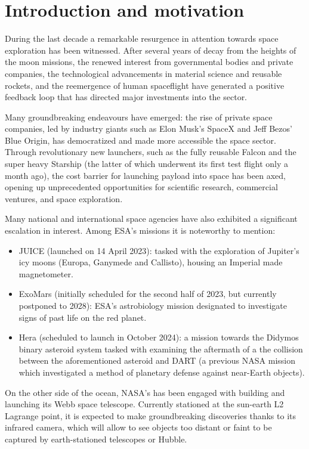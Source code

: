 \section{Introduction and motivation}
During the last decade a remarkable resurgence in attention towards space exploration has been witnessed. After several years of decay from the heights of the moon missions, the renewed interest from governmental bodies and private companies, the technological advancements in material science and reusable rockets, and the reemergence of human spaceflight have generated a positive feedback loop that has directed major investments into the sector.

Many groundbreaking endeavours have emerged: the rise of private space companies, led by industry giants such as Elon Musk's SpaceX and Jeff Bezos' Blue Origin, has democratized and made more accessible the space sector. Through revolutionary new launchers, such as the fully reusable Falcon and the super heavy Starship (the latter of which underwent its first test flight only a month ago), the cost barrier for launching payload into space has been axed, opening up unprecedented opportunities for scientific research, commercial ventures, and space exploration.

Many national and international space agencies have also exhibited a significant escalation in interest. Among ESA's missions it is noteworthy to mention:

\begin{itemize}
    \item JUICE (launched on 14 April 2023): tasked with the exploration of Jupiter's icy moons (Europa, Ganymede and Callisto), housing an Imperial made magnetometer.
    \item ExoMars (initially scheduled for the second half of 2023, but currently postponed to 2028): ESA's astrobiology mission designated to investigate signs of past life on the red planet.
    \item Hera (scheduled to launch in October 2024): a mission towards the Didymos binary asteroid system tasked with examining the aftermath of a the collision between the aforementioned asteroid and DART (a previous NASA mission which investigated a method of planetary defense against near-Earth objects).
\end{itemize}

On the other side of the ocean, NASA's has been engaged with building and launching its Webb space telescope.  Currently stationed at the sun-earth L2 Lagrange point, it is expected to make groundbreaking discoveries thanks to its infrared camera, which will allow to see objects too distant or faint to be captured by earth-stationed telescopes or Hubble.

